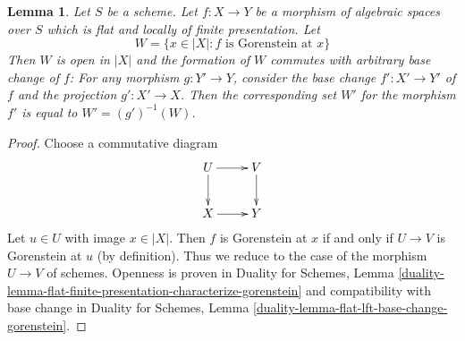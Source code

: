 \documentclass[10pt,a4paper]{amsart}
\theoremstyle{plain}
\newtheorem{lemma}[subsection]{Lemma}
\theoremstyle{definition}
\theoremstyle{remark}
\numberwithin{equation}{subsection}
\begin{document}
\begin{lemma}
\label{lemma-flat-finite-presentation-gorenstein-open}
Let $S$ be a scheme.
Let $f : X \to Y$ be a morphism of algebraic spaces over $S$
which is flat and locally of finite presentation. Let
$$
W = \{x \in |X| : f\text{ is Gorenstein at }x\}
$$
Then $W$ is open in $|X|$ and the formation of $W$
commutes with arbitrary base change of $f$:
For any morphism $g : Y' \to Y$, consider
the base change $f' : X' \to Y'$ of $f$ and the
projection $g' : X' \to X$. Then the corresponding
set $W'$ for the morphism $f'$ is equal to $W' = (g')^{-1}(W)$.
\end{lemma}

\begin{proof}
Choose a commutative diagram
$$
\xymatrix{
U \ar[d] \ar[r] & V \ar[d] \\
X \ar[r] & Y
}
$$
Let $u \in U$ with image $x \in |X|$.
Then $f$ is Gorenstein at $x$ if and only if $U \to V$ is
Gorenstein at $u$ (by definition).
Thus we reduce to the case of the morphism $U \to V$
of schemes. Openness is proven in
Duality for Schemes, Lemma
\ref{duality-lemma-flat-finite-presentation-characterize-gorenstein}
and compatibility with base change in
Duality for Schemes, Lemma \ref{duality-lemma-flat-lft-base-change-gorenstein}.
\end{proof}
\end{document}
